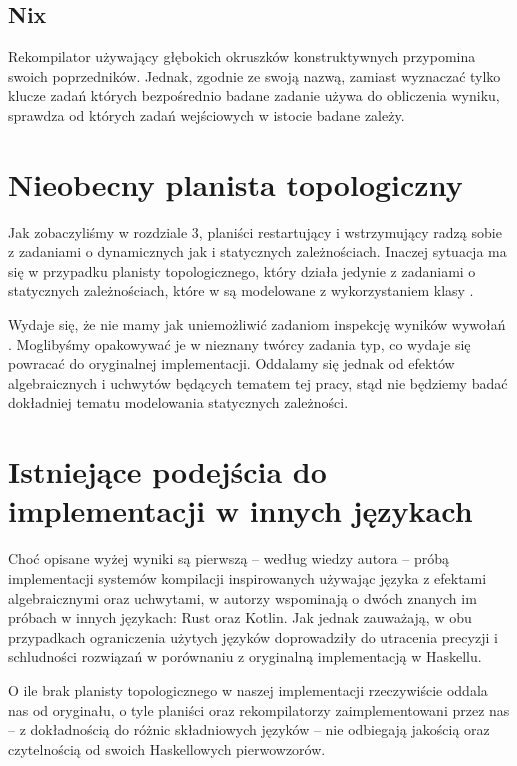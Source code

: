 
\subsection{Nix}



Rekompilator używający głębokich okruszków konstruktywnych przypomina swoich poprzedników. Jednak, zgodnie ze swoją nazwą, zamiast wyznaczać tylko klucze zadań których bezpośrednio badane zadanie używa do obliczenia wyniku, sprawdza od których zadań wejściowych w istocie badane zależy.




\section{Nieobecny planista topologiczny}

Jak zobaczyliśmy w rozdziale 3, planiści restartujący i wstrzymujący radzą sobie z zadaniami o dynamicznych jak i statycznych zależnościach. Inaczej sytuacja ma się w przypadku planisty topologicznego, który działa jedynie z zadaniami o statycznych zależnościach, które w \BSaLC{} są modelowane z wykorzystaniem klasy .

Wydaje się, że nie mamy jak uniemożliwić zadaniom inspekcję wyników wywołań . Moglibyśmy opakowywać je w nieznany twórcy zadania typ, co wydaje się powracać do oryginalnej implementacji. Oddalamy się jednak od efektów algebraicznych i uchwytów będących tematem tej pracy, stąd nie będziemy badać dokładniej tematu modelowania statycznych zależności.

\section{Istniejące podejścia do implementacji w innych językach}

Choć opisane wyżej wyniki są pierwszą -- według wiedzy autora -- próbą implementacji systemów kompilacji inspirowanych \BSaLC{} używając języka z efektami algebraicznymi oraz uchwytami, w \BSaLCTP{} autorzy wspominają o dwóch znanych im próbach w innych językach: Rust\cite{translation_rust} oraz Kotlin\cite{translation_kotlin}. Jak jednak zauważają, w obu przypadkach ograniczenia użytych języków doprowadziły do utracenia precyzji i schludności rozwiązań w porównaniu z oryginalną implementacją w Haskellu.

O ile brak planisty topologicznego w naszej implementacji rzeczywiście oddala nas od oryginału, o tyle planiści oraz rekompilatorzy zaimplementowani przez nas -- z dokładnością do różnic składniowych języków -- nie odbiegają jakością oraz czytelnością od swoich Haskellowych pierwowzorów.
